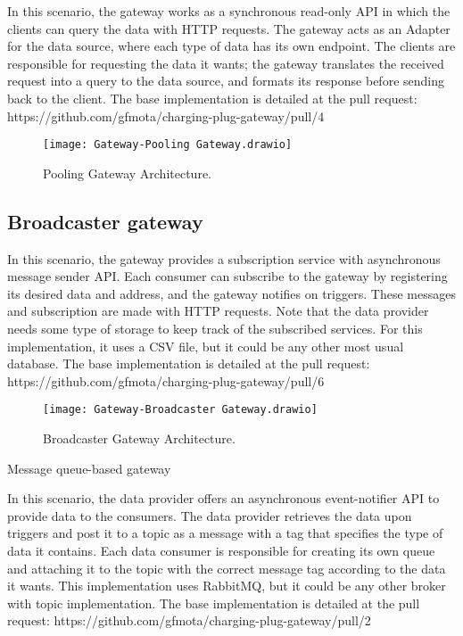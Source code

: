 In this scenario, the gateway works as a synchronous read-only API in which the clients can query the data with HTTP requests. The gateway acts as an Adapter for the data source, where each type of data has its own endpoint. The clients are responsible for requesting the data it wants; the gateway translates the received request into a query to the data source, and formats its response before sending back to the client. The base implementation is detailed at the pull request: https://github.com/gfmota/charging-plug-gateway/pull/4

\begin{figure}
    \centering
    \texttt{[image: Gateway-Pooling Gateway.drawio]}
    \caption{Pooling Gateway Architecture.\label{fig:subfigures}}
\end{figure}

\subsection*{Broadcaster gateway}
\label{sec:broadcaster}

In this scenario, the gateway provides a subscription service with asynchronous message sender API. Each consumer can subscribe to the gateway by registering its desired data and address, and the gateway notifies on triggers. These messages and subscription are made with HTTP requests. Note that the data provider needs some type of storage to keep track of the subscribed services. For this implementation, it uses a CSV file, but it could be any other most usual database. The base implementation is detailed at the pull request: https://github.com/gfmota/charging-plug-gateway/pull/6

\begin{figure}
    \centering
    \texttt{[image: Gateway-Broadcaster Gateway.drawio]}
    \caption{Broadcaster Gateway Architecture.\label{fig:subfigures}}
\end{figure}

{Message queue-based gateway}
\label{sec:messagequeue}

In this scenario, the data provider offers an asynchronous event-notifier API to provide data to the consumers. The data provider retrieves the data upon triggers and post it to a topic as a message with a tag that specifies the type of data it contains. Each data consumer is responsible for creating its own queue and attaching it to the topic with the correct message tag according to the data it wants. This implementation uses RabbitMQ, but it could be any other broker with topic implementation. The base implementation is detailed at the pull request: https://github.com/gfmota/charging-plug-gateway/pull/2

